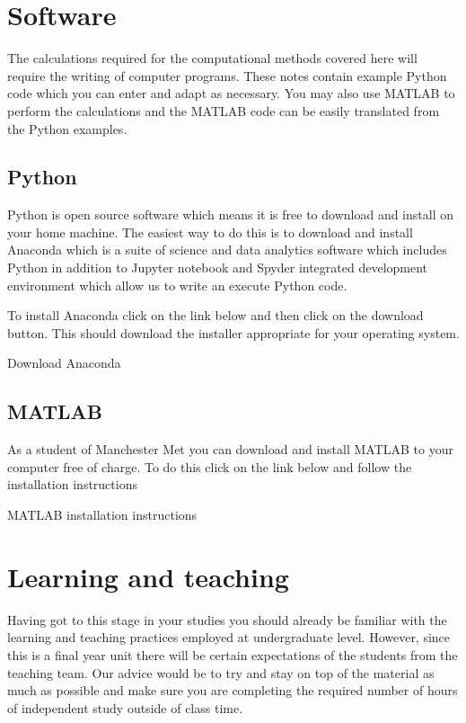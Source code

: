 \documentclass[letterpaper,10pt,english]{jupyterBook}
\begin{document}
\sphinxstepscope


\chapter{Software}
\label{\detokenize{0_Preamble/0.2_Software:software}}\label{\detokenize{0_Preamble/0.2_Software::doc}}
\sphinxAtStartPar
The calculations required for the computational methods covered here will require the writing of computer programs. These notes contain example Python code which you can enter and adapt as necessary. You may also use MATLAB to perform the calculations and the MATLAB code can be easily translated from the Python examples.


\section{Python}
\label{\detokenize{0_Preamble/0.2_Software:python}}
\sphinxAtStartPar
Python is open source software which means it is free to download and install on your home machine. The easiest way to do this is to download and install Anaconda which is a suite of science and data analytics software which includes Python in addition to Jupyter notebook and Spyder integrated development environment which allow us to write an execute Python code.

\sphinxAtStartPar
To install Anaconda click on the link below and then click on the download button. This should download the installer appropriate for your operating system.

\sphinxAtStartPar
Download Anaconda


\section{MATLAB}
\label{\detokenize{0_Preamble/0.2_Software:matlab}}
\sphinxAtStartPar
As a student of Manchester Met you can download and install MATLAB to your computer free of charge. To do this click on the link below and follow the installation instructions

\sphinxAtStartPar
MATLAB installation instructions

\sphinxstepscope


\chapter{Learning and teaching}
\label{\detokenize{0_Preamble/0.3_Learning_and_teaching:learning-and-teaching}}\label{\detokenize{0_Preamble/0.3_Learning_and_teaching::doc}}
\sphinxAtStartPar
Having got to this stage in your studies you should already be familiar with the learning and teaching practices employed at undergraduate level. However, since this is a final year unit there will be certain expectations of the students from the teaching team. Our advice would be to try and stay on top of the material as much as possible and make sure you are completing the required number of hours of independent study outside of class time.
\end{document}

